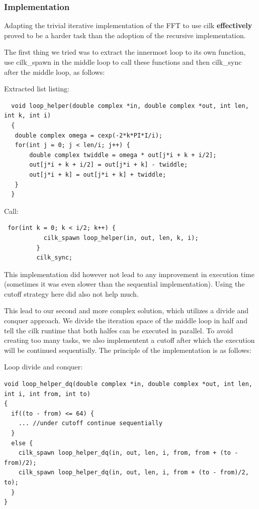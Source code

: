 \subsubsection{Implementation}
Adapting the trivial iterative implementation of the FFT to use cilk \textbf{effectively} proved to be a harder task than the adoption of the recursive implementation. 

The first thing we tried was to extract the innermost loop to its own function, use cilk\_spawn in the middle loop to call these functions and then cilk\_sync after the middle loop, as follows: 

Extracted list listing:
\begin{lstlisting}
  void loop_helper(double complex *in, double complex *out, int len, int k, int i)
  {
   double complex omega = cexp(-2*k*PI*I/i);
   for(int j = 0; j < len/i; j++) {
       double complex twiddle = omega * out[j*i + k + i/2];
       out[j*i + k + i/2] = out[j*i + k] - twiddle;
       out[j*i + k] = out[j*i + k] + twiddle;
   }
  }
\end{lstlisting}

Call: 
\begin{lstlisting}
 for(int k = 0; k < i/2; k++) {  
           cilk_spawn loop_helper(in, out, len, k, i);
         }
         cilk_sync;
\end{lstlisting}

This implementation did however not lead to any improvement in execution time (sometimes it was even slower than the sequential implementation). Using the cutoff strategy here did also not help much. 

This lead to our second and more complex solution, which utilizes a divide and conquer approach. We divide the iteration space of the middle loop in half and tell the cilk runtime that both halfes can be executed in parallel. To avoid creating too many tasks, we also implementent a cutoff after which the execution will be continued sequentially. The principle of the implementation is as follows: 

Loop divide and conquer: 
\begin{lstlisting}
void loop_helper_dq(double complex *in, double complex *out, int len, int i, int from, int to)
{
  if((to - from) <= 64) {
    ... //under cutoff continue sequentially
  }
  else {
    cilk_spawn loop_helper_dq(in, out, len, i, from, from + (to - from)/2);
    cilk_spawn loop_helper_dq(in, out, len, i, from + (to - from)/2, to);
  }
}
\end{lstlisting}

